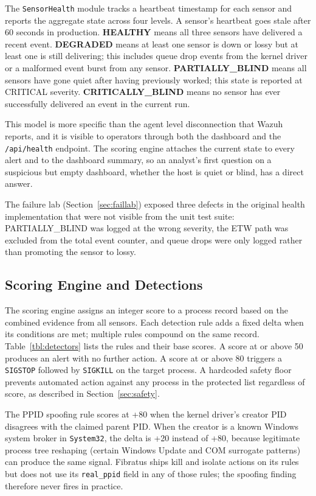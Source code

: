 \documentclass[10pt,twocolumn,letterpaper]{article}
\newcommand{\code}[1]{\texttt{\small #1}}
\begin{document}
The \code{SensorHealth} module tracks a heartbeat timestamp for each sensor and reports
the aggregate state across four levels. A sensor's heartbeat goes stale after 60 seconds
in production. \textbf{HEALTHY} means all three sensors have delivered a recent event.
\textbf{DEGRADED} means at least one sensor is down or lossy but at least one is still
delivering; this includes queue drop events from the kernel driver or a malformed event
burst from any sensor. \textbf{PARTIALLY\_BLIND} means all sensors have gone quiet after
having previously worked; this state is reported at CRITICAL severity. \textbf{CRITICALLY\_BLIND}
means no sensor has ever successfully delivered an event in the current run.

This model is more specific than the agent level disconnection that Wazuh reports, and it
is visible to operators through both the dashboard and the \code{/api/health} endpoint.
The scoring engine attaches the current state to every alert and to the dashboard summary,
so an analyst's first question on a suspicious but empty dashboard, whether the host
is quiet or blind, has a direct answer.

The failure lab (Section~\ref{sec:faillab}) exposed three defects in the original health
implementation that were not visible from the unit test suite: PARTIALLY\_BLIND was logged
at the wrong severity, the ETW path was excluded from the total event counter, and queue
drops were only logged rather than promoting the sensor to lossy.

\subsection{Scoring Engine and Detections}
\label{sec:engine}

The scoring engine assigns an integer score to a process record based on the combined
evidence from all sensors. Each detection rule adds a fixed delta when its conditions are
met; multiple rules compound on the same record. Table~\ref{tbl:detectors} lists the
rules and their base scores. A score at or above 50 produces an alert with no further
action. A score at or above 80 triggers a \code{SIGSTOP} followed by \code{SIGKILL} on
the target process. A hardcoded safety floor prevents automated action against any
process in the protected list regardless of score, as described in
Section~\ref{sec:safety}.

The PPID spoofing rule scores at +80 when the kernel driver's creator PID disagrees with
the claimed parent PID. When the creator is a known Windows system broker in
\code{System32}, the delta is +20 instead of +80, because legitimate process tree
reshaping (certain Windows Update and COM surrogate patterns) can produce the same signal.
Fibratus ships kill and isolate actions on its rules but does not use its \code{real\_ppid}
field in any of those rules; the spoofing finding therefore never fires in practice.
\end{document}
